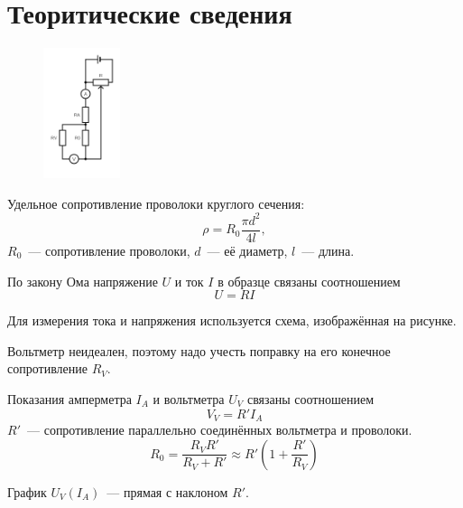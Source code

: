 \section{Теоритические сведения}

\begin{figure}
    \centering
    \includegraphics[width=0.2\textwidth]{img/circuit.png}
\end{figure}

Удельное сопротивление проволоки круглого сечения:
\[\rho=R_0\frac{\pi d^2}{4l},\]
$R_0$~--- сопротивление проволоки, $d$~--- её диаметр, $l$~--- длина.

По закону Ома напряжение $U$ и ток $I$ в образце связаны соотношением
\[U=RI\]

Для измерения тока и напряжения используется схема, изображённая на рисунке.

Вольтметр неидеален, поэтому надо учесть поправку на его конечное сопротивление
$R_V$.

Показания амперметра $I_A$ и вольтметра $U_V$ связаны соотношением
\[V_V=R'I_A\]
$R'$~--- сопротивление параллельно соединённых вольтметра и проволоки.
\[R_0=\frac{R_VR'}{R_V+R'}\approx R'\left(1+\frac{R'}{R_V}\right)\]

График $U_V(I_A)$~--- прямая с наклоном $R'$.
